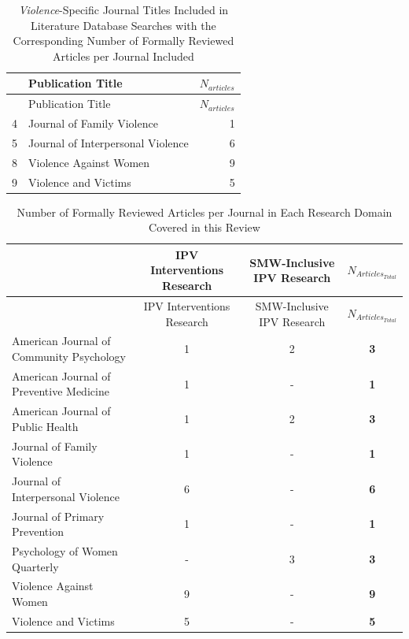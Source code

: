 \documentclass[11pt,]{tufte-book}
\begin{document}
\begin{longtable}[]{@{}llr@{}}
\caption{\emph{Violence}-Specific Journal Titles Included in Literature
Database Searches with the Corresponding Number of Formally Reviewed
Articles per Journal Included \label{tbl:jv}}\tabularnewline
\toprule
& Publication Title & \(N_{articles}\)\tabularnewline
\midrule
\endfirsthead
\toprule
& Publication Title & \(N_{articles}\)\tabularnewline
\midrule
\endhead
4 & Journal of Family Violence & 1\tabularnewline
5 & Journal of Interpersonal Violence & 6\tabularnewline
8 & Violence Against Women & 9\tabularnewline
9 & Violence and Victims & 5\tabularnewline
\bottomrule
\end{longtable}

\newpage

\begin{longtable}[]{@{}lccc@{}}
\caption{Number of Formally Reviewed Articles per Journal in Each
Research Domain Covered in this Review \label{tbl:jsft}}\tabularnewline
\toprule
& IPV Interventions Research & SMW-Inclusive IPV Research &
\(N_{Articles_{Total}}\)\tabularnewline
\midrule
\endfirsthead
\toprule
& IPV Interventions Research & SMW-Inclusive IPV Research &
\(N_{Articles_{Total}}\)\tabularnewline
\midrule
\endhead
American Journal of Community Psychology & 1 & 2 &
\textbf{3}\tabularnewline
American Journal of Preventive Medicine & 1 & - &
\textbf{1}\tabularnewline
American Journal of Public Health & 1 & 2 & \textbf{3}\tabularnewline
Journal of Family Violence & 1 & - & \textbf{1}\tabularnewline
Journal of Interpersonal Violence & 6 & - & \textbf{6}\tabularnewline
Journal of Primary Prevention & 1 & - & \textbf{1}\tabularnewline
Psychology of Women Quarterly & - & 3 & \textbf{3}\tabularnewline
Violence Against Women & 9 & - & \textbf{9}\tabularnewline
Violence and Victims & 5 & - & \textbf{5}\tabularnewline
\bottomrule
\end{longtable}

\newpage
\end{document}
